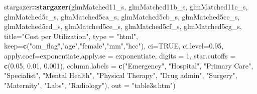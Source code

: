 \documentclass[]{article}
\newenvironment{Shaded}{\begin{snugshade}}{\end{snugshade}}
\newcommand{\KeywordTok}[1]{\textcolor[rgb]{0.13,0.29,0.53}{\textbf{#1}}}
\newcommand{\DataTypeTok}[1]{\textcolor[rgb]{0.13,0.29,0.53}{#1}}
\newcommand{\DecValTok}[1]{\textcolor[rgb]{0.00,0.00,0.81}{#1}}
\newcommand{\FloatTok}[1]{\textcolor[rgb]{0.00,0.00,0.81}{#1}}
\newcommand{\StringTok}[1]{\textcolor[rgb]{0.31,0.60,0.02}{#1}}
\newcommand{\OtherTok}[1]{\textcolor[rgb]{0.56,0.35,0.01}{#1}}
\newcommand{\OperatorTok}[1]{\textcolor[rgb]{0.81,0.36,0.00}{\textbf{#1}}}
\newcommand{\NormalTok}[1]{#1}
\begin{document}
\begin{Shaded}
\begin{Highlighting}[]
\NormalTok{stargazer}\OperatorTok{::}\KeywordTok{stargazer}\NormalTok{(glmMatched11_s, glmMatched11b_s, glmMatched11c_s, glmMatched5c_s, glmMatched5ca_s, glmMatched5cb_s,  glmMatched5cc_s,  glmMatched5cd_s,  glmMatched5ce_s,  glmMatched5cf_s,  glmMatched5cg_s, }
          \DataTypeTok{title=}\StringTok{"Cost per Utilization"}\NormalTok{, }
          \DataTypeTok{type =} \StringTok{"html"}\NormalTok{,}
          \DataTypeTok{keep=}\KeywordTok{c}\NormalTok{(}\StringTok{"om_flag"}\NormalTok{,}\StringTok{"age"}\NormalTok{,}\StringTok{"female"}\NormalTok{,}\StringTok{"mm"}\NormalTok{,}\StringTok{"hcc"}\NormalTok{),}
          \DataTypeTok{ci=}\OtherTok{TRUE}\NormalTok{, }\DataTypeTok{ci.level=}\FloatTok{0.95}\NormalTok{,}
          \DataTypeTok{apply.coef=}\NormalTok{exponentiate,}\DataTypeTok{apply.se =}\NormalTok{ exponentiate,}
          \DataTypeTok{digits =} \DecValTok{1}\NormalTok{, }
          \DataTypeTok{star.cutoffs =} \KeywordTok{c}\NormalTok{(}\FloatTok{0.05}\NormalTok{, }\FloatTok{0.01}\NormalTok{, }\FloatTok{0.001}\NormalTok{),}
          \DataTypeTok{column.labels =} \KeywordTok{c}\NormalTok{(}\StringTok{"Emergency"}\NormalTok{, }\StringTok{"Hospital"}\NormalTok{, }\StringTok{"Primary Care"}\NormalTok{, }\StringTok{"Specialist"}\NormalTok{, }\StringTok{"Mental Health"}\NormalTok{, }\StringTok{"Physical Therapy"}\NormalTok{, }\StringTok{"Drug admin"}\NormalTok{, }\StringTok{"Surgery"}\NormalTok{, }\StringTok{"Maternity"}\NormalTok{, }\StringTok{"Labs"}\NormalTok{, }\StringTok{"Radiology"}\NormalTok{),}
          \DataTypeTok{out =} \StringTok{"table3s.htm"}\NormalTok{)}
\end{Highlighting}
\end{Shaded}
\end{document}

